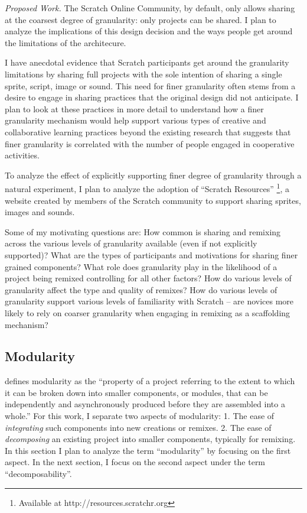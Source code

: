 \emph{Proposed Work.}
The Scratch Online Community, by default, only allows sharing at the coarsest degree of granularity: only projects can be shared. 
I plan to analyze the implications of this design decision and the ways  people get around the limitations of the architecure.

I have anecdotal evidence that Scratch participants get around the granularity limitations by sharing full projects with the sole intention of sharing a single sprite, script, image or sound.
This need for finer granularity often stems from a desire to engage in sharing practices that the original design did not anticipate. 
I plan to look at these practices in more detail to understand how a finer granularity mechanism would help support various types of creative and collaborative learning practices beyond the existing research that suggests that finer granularity is correlated with the number of people engaged in cooperative activities.

To analyze the effect of explicitly supporting finer degree of granularity through a natural experiment, I plan to analyze the adoption of ``Scratch Resources'' \footnote{Available at http://resources.scratchr.org}, a website created by members of the Scratch community to support sharing sprites, images and sounds. 

Some of my motivating questions are: 
How common is sharing and remixing across the various levels of granularity available (even if not explicitly supported)?
What are the types of participants and motivations for sharing finer grained components?
What role does granularity play in the likelihood of a project being remixed controlling for all other factors?
How do various levels of granularity affect the type and quality of remixes?
How do various levels of granularity support various levels of familiarity with Scratch -- are novices more likely to rely on coarser granularity when engaging in remixing as a scaffolding mechanism?

\subsection{Modularity}
\citet{benkler_coases_2002} defines modularity as the ``property of a project referring to the extent to which it can be broken down into smaller components, or modules, that can be independently and asynchronously produced before they are assembled into a whole.''
For this work, I separate two aspects of modularity:
1. The ease of \emph{integrating} such components into new creations or remixes.
2. The ease of \emph{decomposing} an existing project into smaller components, typically for remixing.
In this section I plan to analyze the term ``modularity'' by focusing on the first aspect.
In the next section, I focus on the second aspect under the term ``decomposability''.

